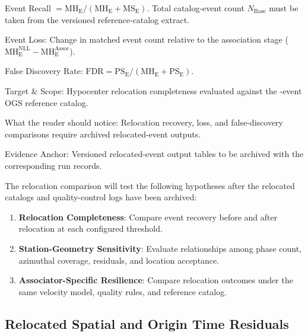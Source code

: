 \begin{table}[htbp]
\begin{threeparttable}
\begin{tablenotes}[flushleft]
      \footnotesize
    \item[a] Event Recall $= \mathrm{MH}_{\mathrm{E}} /
      (\mathrm{MH}_{\mathrm{E}} + \mathrm{MS}_{\mathrm{E}})$. Total
      catalog-event count $N_{\mathrm{Base}}$ must be taken from the
      versioned reference-catalog extract.
    \item[b] Event Loss: Change in matched event count relative to
      the association stage
      ($\mathrm{MH}_{\mathrm{E}}^{\mathrm{NLL}} -
      \mathrm{MH}_{\mathrm{E}}^{\mathrm{Assoc}}$).
    \item[c] False Discovery Rate: $\mathrm{FDR} =
      \mathrm{PS}_{\mathrm{E}} / (\mathrm{MH}_{\mathrm{E}} +
      \mathrm{PS}_{\mathrm{E}})$.
    \item Target \& Scope: Hypocenter relocation completeness
      evaluated against the -event \ac{OGS}
      reference catalog.
    \item What the reader should notice: Relocation recovery, loss, and
      false-discovery comparisons require archived relocated-event outputs.
    \item Evidence Anchor: Versioned relocated-event output tables to be
      archived with the corresponding run records.
    \end{tablenotes}
  \end{threeparttable}
\end{table}

The relocation comparison will test the following hypotheses after the
relocated catalogs and quality-control logs have been archived:
\begin{enumerate}
  \item \textbf{Relocation Completeness}: Compare event recovery before and
    after relocation at each configured threshold.
  \item \textbf{Station-Geometry Sensitivity}: Evaluate relationships among
    phase count, azimuthal coverage, residuals, and location acceptance.
  \item \textbf{Associator-Specific Resilience}: Compare relocation outcomes
    under the same velocity model, quality rules, and reference catalog.
\end{enumerate}

\subsection{Relocated Spatial and Origin Time Residuals}
\label{subsec:relocated_residuals}

